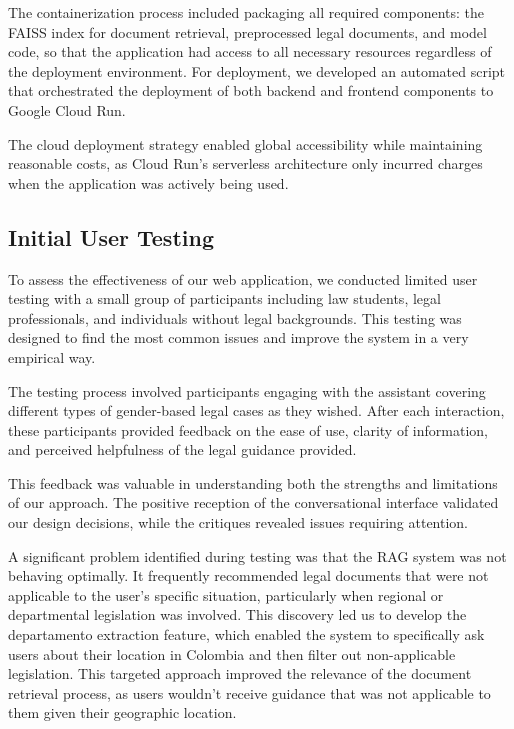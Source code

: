The containerization process included packaging all required components: the FAISS index for document retrieval, preprocessed legal documents, 
and model code, so that the application had access to all necessary resources regardless of the deployment environment.
For deployment, we developed an automated script that orchestrated the deployment of both backend and frontend components to Google Cloud Run. 

The cloud deployment strategy enabled global accessibility while maintaining reasonable costs, as Cloud Run's serverless architecture only incurred charges when the 
application was actively being used.

\subsection{Initial User Testing}
\label{subsec:user-testing}

To assess the effectiveness of our web application, we conducted limited user testing with a small group of participants including law students, legal professionals, 
and individuals without legal backgrounds. This testing was designed to find the most common issues and improve the system in a very empirical way.

The testing process involved participants engaging with the assistant covering different types of gender-based legal cases as they wished. After each interaction, 
these participants provided feedback on the ease of use, clarity of information, and perceived helpfulness of the legal guidance provided.

This feedback was valuable in understanding both the strengths and limitations of our approach. The positive reception of the conversational interface validated our design 
decisions, while the critiques revealed issues requiring attention.

A significant problem identified during testing was that the RAG system was not behaving optimally. It frequently recommended legal documents that were not applicable to the 
user's specific situation, particularly when regional or departmental legislation was involved. This discovery led us to develop the departamento extraction feature, 
which enabled the system to specifically ask users about their location in Colombia and then filter out non-applicable legislation. This targeted approach  
improved the relevance of the document retrieval process, as users wouldn't receive guidance that was not applicable to them given their geographic location.

